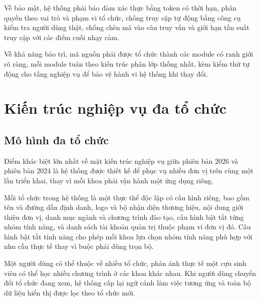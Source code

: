 \documentclass[12pt,a4paper,oneside]{report}
\begin{document}
Về bảo mật, hệ thống phải bảo đảm xác thực bằng token có thời hạn, phân quyền theo vai trò và phạm vi tổ chức, chống truy cập tự động bằng công cụ kiểm tra người dùng thật, chống chèn mã vào câu truy vấn và giới hạn tần suất truy cập với các điểm cuối nhạy cảm.

Về khả năng bảo trì, mã nguồn phải được tổ chức thành các module có ranh giới rõ ràng, mỗi module tuân theo kiến trúc phân lớp thống nhất, kèm kiểm thử tự động cho tầng nghiệp vụ để bảo vệ hành vi hệ thống khi thay đổi.

\section{Kiến trúc nghiệp vụ đa tổ chức}

\subsection{Mô hình đa tổ chức}

Điểm khác biệt lớn nhất về mặt kiến trúc nghiệp vụ giữa phiên bản 2026 và phiên bản 2024 là hệ thống được thiết kế để phục vụ nhiều đơn vị trên cùng một lần triển khai, thay vì mỗi khoa phải vận hành một ứng dụng riêng.

Mỗi tổ chức trong hệ thống là một thực thể độc lập có cấu hình riêng, bao gồm tên và đường dẫn định danh, logo và bộ nhận diện thương hiệu, nội dung giới thiệu đơn vị, danh mục ngành và chương trình đào tạo, cấu hình bật tắt từng nhóm tính năng, và danh sách tài khoản quản trị thuộc phạm vi đơn vị đó. Cấu hình bật tắt tính năng cho phép mỗi khoa lựa chọn nhóm tính năng phù hợp với nhu cầu thực tế thay vì buộc phải dùng trọn bộ.

Một người dùng có thể thuộc về nhiều tổ chức, phản ánh thực tế một cựu sinh viên có thể học nhiều chương trình ở các khoa khác nhau. Khi người dùng chuyển đổi tổ chức đang xem, hệ thống cấp lại ngữ cảnh làm việc tương ứng và toàn bộ dữ liệu hiển thị được lọc theo tổ chức mới.
\end{document}
